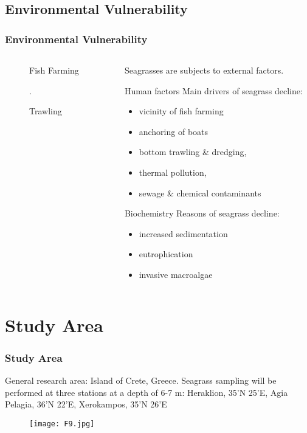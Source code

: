 \documentclass[pdflatex,compress,8pt,
	xcolor={dvipsnames,dvipsnames,svgnames,x11names,table},
	hyperref={colorlinks = true,breaklinks = true, urlcolor = NavyBlue, breaklinks = true}]{beamer}
\begin{document}
\subsection{Environmental Vulnerability}
\begin{frame}\frametitle{Environmental Vulnerability}
\begin{minipage}[0.4\textheight]{\textwidth}
\begin{columns}[T]
\begin{column}{0.5\textwidth}
\begin{figure}[H]
	\centering
		\caption{Fish Farming}
		\caption{Trawling}. 
\end{figure}
\end{column}
\begin{column}{0.5\textwidth}
Seagrasses are subjects to external factors.

\begin{alertblock}{Human factors}
Main drivers of seagrass decline: 
\begin{itemize}
	\item vicinity of fish farming
	\item anchoring of boats
	\item bottom trawling \& dredging, 
	\item thermal pollution,
	\item sewage \& chemical contaminants
\end{itemize}
\end{alertblock}

\begin{block}{Biochemistry}
Reasons of seagrass decline:
\begin{itemize}
	\item increased sedimentation
	\item eutrophication
	\item invasive macroalgae
\end{itemize}
\end{block}

\end{column}
\end{columns}
\end{minipage}
\end{frame}

\section{Study Area}
\begin{frame}\frametitle{Study Area}
General research area: Island of Crete, Greece.
Seagrass sampling will be performed at three stations at a depth of 6-7 m:
Heraklion, 35'N 25'E, Agia Pelagia, 36'N 22'E, Xerokampos, 35'N 26'E
\begin{figure}[H]
	\centering
		\texttt{[image: F9.jpg]}
\end{figure}
\end{frame}
\end{document}
